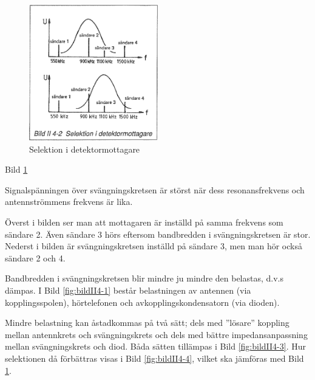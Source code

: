 \begin{figure}
  \includegraphics[width=0.5\textwidth]{images/bild_2_4-02}
  \caption{Selektion i detektormottagare}
  \label{fig:bildII4-2}
\end{figure}

Bild \ref{fig:bildII4-2}

Signalspänningen över svängningskretsen är störst när dess
resonansfrekvens och antennströmmens frekvens är lika.

Överst i bilden ser man att mottagaren är inställd på samma frekvens
som sändare 2.  Även sändare 3 hörs eftersom bandbredden i
svängningskretsen är stor. Nederst i bilden är svängningskretsen
inställd på sändare 3, men man hör också sändare 2 och 4.

Bandbredden i svängningskretsen blir mindre ju mindre den belastas,
d.v.s dämpas. I Bild \ref{fig:bildII4-1} består belastningen av antennen (via
kopplingsspolen), hörtelefonen och avkopplingskondensatorn (via
dioden).

Mindre belastning kan åstadkommas på två sätt; dels med ''lösare''
koppling mellan antennkrets och svängningskrets och dels med bättre
impedansanpassning mellan svängningskrets och diod. Båda sätten
tillämpas i Bild \ref{fig:bildII4-3}. Hur selektionen då förbättras visas i
Bild \ref{fig:bildII4-4}, vilket ska jämföras med Bild \ref{fig:bildII4-2}.


